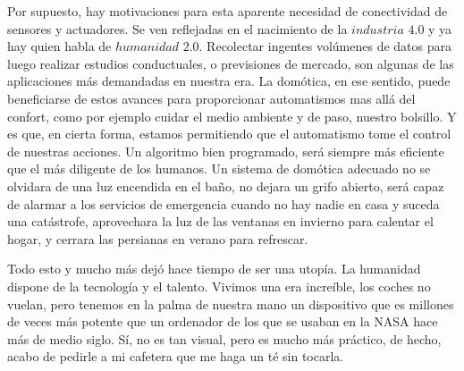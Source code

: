 Por supuesto, hay motivaciones para esta aparente necesidad de conectividad de sensores y actuadores. Se ven reflejadas en el nacimiento de la $industria$ $4{.}0$ y ya hay quien habla de $humanidad$ $2{.}0$. Recolectar ingentes volúmenes de datos para luego realizar estudios conductuales, o previsiones de mercado, son algunas de las aplicaciones más demandadas en nuestra era. La domótica, en ese sentido, puede beneficiarse de estos avances para proporcionar automatismos mas allá del confort, como por ejemplo cuidar el medio ambiente y de paso, nuestro bolsillo. Y es que, en cierta forma, estamos permitiendo que el automatismo tome el control de nuestras acciones. Un algoritmo bien programado, será siempre más eficiente que el más diligente de los humanos. Un sistema de domótica adecuado no se olvidara de una luz encendida en el baño, no dejara un grifo abierto, será capaz de alarmar a los servicios de emergencia cuando no hay nadie en casa y suceda una catástrofe, aprovechara la luz de las ventanas en invierno para calentar el hogar, y cerrara las persianas en verano para refrescar.

\vspace{0.5cm}

Todo esto y mucho más dejó hace tiempo de ser una utopía. La humanidad dispone de la tecnología y el talento. Vivimos una era increíble, los coches no vuelan, pero tenemos en la palma de nuestra mano un dispositivo que es millones de veces más potente que un ordenador de los que se usaban en la NASA hace más de medio siglo. Sí, no es tan visual, pero es mucho más práctico, de hecho, acabo de pedirle a mi cafetera que me haga un té sin tocarla.
